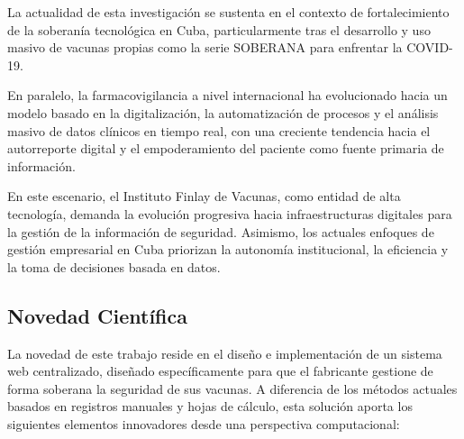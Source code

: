 La actualidad de esta investigación se sustenta en el contexto de fortalecimiento de la soberanía tecnológica en Cuba, particularmente tras el desarrollo y uso masivo de vacunas propias como la serie SOBERANA para enfrentar la COVID-19.

En paralelo, la farmacovigilancia a nivel internacional ha evolucionado hacia un modelo basado en la digitalización, la automatización de procesos y el análisis masivo de datos clínicos en tiempo real, con una creciente tendencia hacia el \gls{autorreporte} digital y el empoderamiento del paciente como fuente primaria de información.

En este escenario, el Instituto Finlay de Vacunas, como entidad de alta tecnología, demanda la evolución progresiva hacia infraestructuras digitales para la gestión de la información de seguridad. Asimismo, los actuales enfoques de gestión empresarial en Cuba priorizan la autonomía institucional, la eficiencia y la toma de decisiones basada en datos.


\subsection{Novedad Científica}

La novedad de este trabajo reside en el diseño e implementación de un sistema web centralizado, diseñado específicamente para que el fabricante gestione de forma soberana la seguridad de sus vacunas. A diferencia de los métodos actuales basados en registros manuales y hojas de cálculo, esta solución aporta los siguientes elementos innovadores desde una perspectiva computacional:

